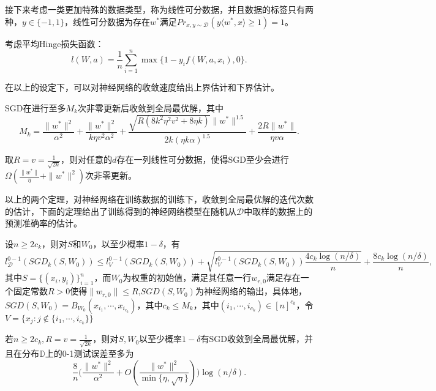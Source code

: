 \par
接下来考虑一类更加特殊的数据类型，称为线性可分数据，并且数据的标签只有两种，$y\in \{-1,1\}$，线性可分数据为存在$w^*$满足$Pr_{x,y\sim \mathcal{D}}(y\langle w^*, x\rangle\geq 1) = 1$。
\par
考虑平均Hinge损失函数：
\[
l(W,a) = \frac{1}{n}\sum_{i=1}^n \max\{1-y_if(W,a,x_i),0\}.
\]
\par
在以上的设定下，可以对神经网络的收敛速度给出上界估计和下界估计\cite{brutzkus2017sgd}。
\begin{theorem}[上界]
SGD在进行至多$M_k$次非零更新后收敛到全局最优解，其中
\[
M_k = \frac{\|w^*\|^2}{\alpha^2}+\frac{\|w^*\|^2}{k\eta v^2\alpha^2}+\frac{\sqrt{R(8k^2\eta^2v^2+8\eta k)}\|w^*\|^{1.5}}{2k(\eta k \alpha)^{1.5}} + \frac{2R\|w^*\|}{\eta v\alpha}.
\]
\end{theorem}
\begin{theorem}[下界]
取$R = v = \frac{1}{\sqrt{2k}}$，则对任意的$d$存在一列线性可分数据，使得SGD至少会进行$\Omega(\frac{\|w^*\|}{\eta}+\|w^*\|^2)$次非零更新。
\end{theorem}
\par
以上的两个定理，对神经网络在训练数据的训练下，收敛到全局最优解的迭代次数的估计，下面的定理给出了训练得到的神经网络模型在随机从$\mathcal{D}$中取样的数据上的预测准确率的估计。
\begin{theorem}
设$n\geq 2c_k$，则对$S$和$W_0$，以至少概率$1-\delta$，有
\[
l_{\mathcal{D}}^{0-1}(SGD_k(S,W_0))\leq l_{V}^{0-1}(SGD_k(S,W_0)) + \sqrt{l_{V}^{0-1}(SGD_k(S,W_0))\frac{4c_k\log(n/\delta)}{n}} + \frac{8c_k\log(n/\delta)}{n},
\]
其中$S = \{(x_i,y_i)\}_{i=1}^n$，而$W_0$为权重的初始值，满足其任意一行$w_{r,0}$满足存在一个固定常数$R>0$使得$\|w_{r,0}\|\leq R$,$SGD(S,W_0)$为神经网络的输出，具体地，$SGD(S,W_0) = B_{W_0}(x_{i_1},\cdots,x_{i_{c_k}})$，其中$c_k\leq M_k$，其中$(i_1,\cdots,i_{c_k})\in [n]^{c_k}$，令$V = \{x_j:j\notin \{i_1,\cdots,i_{c_k}\}\}$
\end{theorem}

\begin{theorem}
若$n\geq 2c_k, R = v = \frac{1}{\sqrt{2k}}$，则对$S,W_0$以至少概率$1-\delta$有SGD收敛到全局最优解，并且在分布$\mathbb{D}$上的0-1测试误差至多为
\[
\frac{8}{n}\big(\frac{\|w^*\|^2}{\alpha^2}+O(\frac{\|w^*\|^2}{\min\{\eta,\sqrt{\eta}\}})\big)\log(n/\delta).
\]
\end{theorem}


